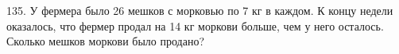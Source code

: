 135. У фермера было 26 мешков с морковью по 7 кг в каждом. К концу недели оказалось, что фермер продал на 14 кг моркови больше, чем у него осталось. Сколько мешков моркови было продано?\\
